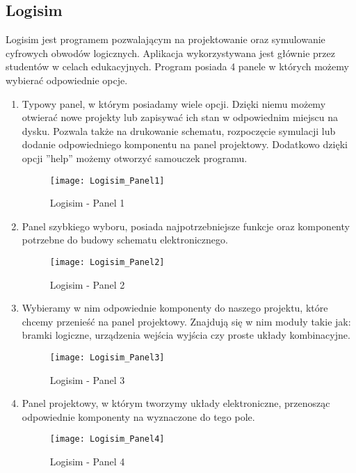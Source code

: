 \documentclass[12pt, a4paper, onside, polish]{article}				%
\begin{document}
\subsection{Logisim}
\hspace{\parindent}
Logisim jest programem pozwalającym na projektowanie oraz symulowanie cyfrowych obwodów logicznych. Aplikacja wykorzystywana jest głównie przez studentów w celach edukacyjnych.  \newline\newline
Program posiada 4 panele w których możemy wybierać odpowiednie opcje.

 \begin{enumerate}
\item Typowy panel, w którym posiadamy wiele opcji. Dzięki niemu możemy otwierać nowe projekty lub zapisywać ich stan w odpowiednim miejscu na dysku. Pozwala także na drukowanie schematu, rozpoczęcie symulacji lub dodanie odpowiedniego komponentu na panel projektowy. Dodatkowo dzięki opcji ''help'' możemy otworzyć samouczek programu.
  	\begin{figure}[hbt!]
  	  {\centering \texttt{[image: Logisim\_Panel1]} \caption{Logisim - Panel 1}}\vspace{5mm}
  	  \end{figure}
  	  
\item  Panel szybkiego wyboru, posiada najpotrzebniejsze funkcje oraz komponenty potrzebne do budowy schematu elektronicznego.
  	\begin{figure}[hbt!]
  	  {\centering \texttt{[image: Logisim\_Panel2]} \caption{Logisim - Panel 2}}\vspace{5mm}
  	  \end{figure}
  	  
 \cleardoublepage	  
\item Wybieramy w nim odpowiednie komponenty do naszego projektu, które chcemy przenieść na panel projektowy. Znajdują się w nim moduły takie jak: bramki logiczne, urządzenia wejścia wyjścia czy proste układy kombinacyjne.
  	\begin{figure}[hbt!]
  	  {\centering \texttt{[image: Logisim\_Panel3]} \caption{Logisim - Panel 3}}\vspace{5mm}
  	  \end{figure}
  	  
 
 \item Panel projektowy, w którym tworzymy układy elektroniczne, przenosząc odpowiednie komponenty na wyznaczone do tego pole.
  	\begin{figure}[hbt!]
  	  {\centering \texttt{[image: Logisim\_Panel4]} \caption{Logisim - Panel 4}}\vspace{5mm}
  	  \end{figure}
 \end{enumerate}
 
\end{document}
